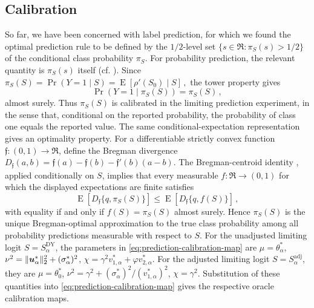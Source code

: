 \documentclass{article}
\makeatletter
\DeclareMathOperator{\expect}{E}
\theoremstyle{definition}
\newcommand{\vnorm}[1]{%
	\ensuremath{%
		\if@display
		\left\| #1 \right\|
		\else
		\| #1 \|
		\fi
	}%
}
\newcommand*{\bb}{\boldsymbol}
\def\bu{\bb{u}}
\makeatother
\begin{document}
\begin{bibunit}
\subsection{Calibration}
\label{subsec:calibration}

So far, we have been concerned with label prediction, for 
which we found the optimal prediction rule to be defined by the 
$1/2$-level set
$
    \{s\in\Re:\pi_S(s)>1/2\} 
$ of the conditional class probability $\pi_S$. 
For probability
prediction, the relevant quantity is $\pi_S(s)$ itself (cf. \citealt{li+sur:2025}). Since
$
    \pi_S(S)
    =
    \Pr(Y=1\mid S)
    =
    \expect[\rho'(S_0)\mid S] \,, 
$
the tower property gives
\begin{equation}
\label{eq:prediction-calibration-identity}
    \Pr(Y=1\mid\pi_S(S))
    =
    \pi_S(S) \,,
\end{equation}
almost surely. 
Thus $\pi_S(S)$ is calibrated in the limiting prediction experiment, in the
sense that, conditional on the reported probability, the probability of
class one equals the reported value.
The same conditional-expectation representation gives an optimality
property. For a differentiable strictly convex function
$\mathfrak f:(0,1)\to\Re$, define the Bregman divergence
$
    D_{\mathfrak f}(a,b)
    =
    \mathfrak f(a)-\mathfrak f(b)-\mathfrak f'(b)(a-b) 
$. 
The Bregman-centroid identity
\citep[Proposition~1]{banerjee+et+al:2005}, applied conditionally on $S$,
implies that every measurable $f:\Re\to(0,1)$ for which the displayed
expectations are finite satisfies
\begin{equation}
\label{eq:prediction-bregman-optimality}
    \expect\left[
        D_{\mathfrak f}\{q,\pi_S(S)\}
    \right]
    \leq
    \expect\left[
        D_{\mathfrak f}\{q,f(S)\}
    \right] \,,
\end{equation}
with equality if and only if $f(S)=\pi_S(S)$ almost surely. Hence
$\pi_S(S)$ is the unique Bregman-optimal approximation to the true class
probability among all probability predictions measurable with respect
to $S$.
For the unadjusted limiting logit $S=S_\alpha^{\mathrm{DY}}$, the parameters
in \eqref{eq:prediction-calibration-map} are
$
    \mu=\theta_\alpha^*$, $
    \nu^2=\vnorm{\bu_\alpha^*}_2^2+(\sigma_\alpha^*)^2$, $
    \chi=\gamma^2v_{1,\alpha}^*+\varphi v_{2,\alpha}^* 
$.
For the adjusted limiting logit $S=S_\alpha^{\mathrm{adj}}$, they are
$
    \mu=\theta_0^*$, $
    \nu^2=\gamma^2+(\sigma_\alpha^*)^2 / (v_{1,\alpha}^*)^2$, $
    \chi=\gamma^2
$.
Substitution of these quantities into
\eqref{eq:prediction-calibration-map} gives the respective oracle
calibration maps.


\end{bibunit}
\end{document}
